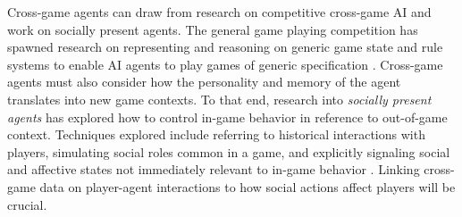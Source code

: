 \documentclass[conference]{IEEEtran}
\begin{document}
Cross-game agents can draw from research on competitive cross-game AI and work on socially present agents. 
The general game playing competition has spawned research on representing and reasoning on generic game state and rule systems to enable AI agents to play games of generic specification \cite{genesereth2005:general-game-playing}.
Cross-game agents must also consider how the personality and memory of the agent translates into new game contexts.
To that end, research into {\em socially present agents} has explored how to control in-game behavior in reference to out-of-game context. 
Techniques explored include referring to historical interactions with players, simulating social roles common in a game, and explicitly signaling social and affective states not immediately relevant to in-game behavior \cite{pereira2012:soc-boardgame}.
Linking cross-game data on player-agent interactions to how social actions affect players will be crucial.
%
%
\end{document}
